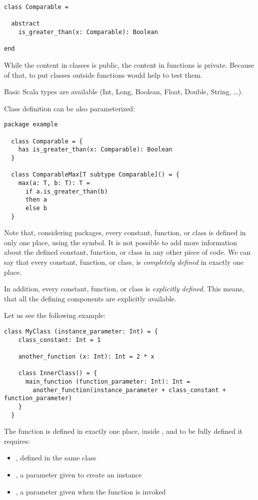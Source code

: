 \begin{lstlisting}[label={lst:exampleAbstractFunction}]
class Comparable =

  abstract
    is_greater_than(x: Comparable): Boolean

end
\end{lstlisting}

While the content in classes is public, the content in functions is private.
Because of that, to put classes outside functions would help to test them.

Basic Scala types are available (Int, Long, Boolean, Float, Double, String, \ldots).

Class definition can be also parameterized:
\begin{lstlisting}[label={lst:exampleParameterizedClass}]
  package example

  class Comparable = {
    has is_greater_than(x: Comparable): Boolean
  }

  class ComparableMax[T subtype Comparable]() = {
    max(a: T, b: T): T =
      if a.is_greater_than(b)
      then a
      else b
  }
\end{lstlisting}

Note that, considering packages, every constant, function, or class is defined in only one place, using the \sodadef symbol.
It is not possible to add more information about the defined constant, function, or class in any other piece of code.
We can say that every constant, function, or class, is \emph{completely defined} in exactly one place.

In addition, every constant, function, or class is \emph{explicitly defined}.
This means, that all the defining components are explicitly available.

Let us see the following example:
\begin{lstlisting}[label={lst:exampleExplicitDefinition}]
  class MyClass (instance_parameter: Int) = {
    class_constant: Int = 1

    another_function (x: Int): Int = 2 * x

    class InnerClass() = {
      main_function (function_parameter: Int): Int =
        another_function(instance_parameter + class_constant + function_parameter)
    }
  }
\end{lstlisting}

The function  is defined in exactly one place, inside , and to be fully defined it requires:
\begin{itemize}
    \item {}, defined in the same class
    \item {}, a parameter given to create an instance
    \item {}, a parameter given when the function is invoked
\end{itemize}

